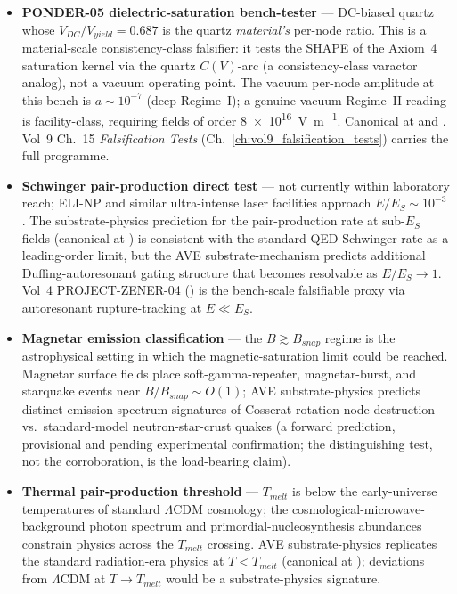 \begin{itemize}
    \item \textbf{PONDER-05 dielectric-saturation bench-tester} --- DC-biased quartz whose $V_{DC}/V_{yield} = 0.687$ is the quartz \emph{material's} per-node ratio. This is a material-scale consistency-class falsifier: it tests the SHAPE of the Axiom~4 saturation kernel via the quartz $C(V)$-arc (a consistency-class varactor analog), not a vacuum operating point. The vacuum per-node amplitude at this bench is $a \sim 10^{-7}$ (deep Regime~I); a genuine vacuum Regime~II reading is facility-class, requiring fields of order \qty{8e16}{\volt\per\metre}. Canonical at  and . Vol~9 Ch.~15 \emph{Falsification Tests} (Ch.~\ref{ch:vol9_falsification_tests}) carries the full programme.
    \item \textbf{Schwinger pair-production direct test} --- not currently within laboratory reach; ELI-NP and similar ultra-intense laser facilities approach $E/E_S \sim 10^{-3}$. The substrate-physics prediction for the pair-production rate at sub-$E_S$ fields (canonical at ) is consistent with the standard QED Schwinger rate as a leading-order limit, but the AVE substrate-mechanism predicts additional Duffing-autoresonant gating structure that becomes resolvable as $E/E_S \to 1$. Vol~4 PROJECT-ZENER-04 () is the bench-scale falsifiable proxy via autoresonant rupture-tracking at $E \ll E_S$.
    \item \textbf{Magnetar emission classification} --- the $B \gtrsim B_{snap}$ regime is the astrophysical setting in which the magnetic-saturation limit could be reached. Magnetar surface fields place soft-gamma-repeater, magnetar-burst, and starquake events near $B/B_{snap} \sim O(1)$; AVE substrate-physics predicts distinct emission-spectrum signatures of Cosserat-rotation node destruction vs.~standard-model neutron-star-crust quakes (a forward prediction, provisional and pending experimental confirmation; the distinguishing test, not the corroboration, is the load-bearing claim).
    \item \textbf{Thermal pair-production threshold} --- $T_{melt}$ is below the early-universe temperatures of standard $\Lambda$CDM cosmology; the cosmological-microwave-background photon spectrum and primordial-nucleosynthesis abundances constrain physics across the $T_{melt}$ crossing. AVE substrate-physics replicates the standard radiation-era physics at $T < T_{melt}$ (canonical at ); deviations from $\Lambda$CDM at $T \to T_{melt}$ would be a substrate-physics signature.
\end{itemize}

